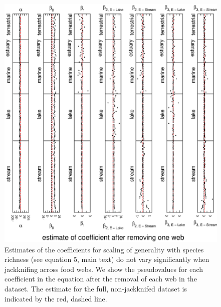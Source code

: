 \documentclass[12pt]{article}
\begin{document}
  \newpage

    \begin{figure}[!h]
    \centerline{\includegraphics*[height=.75\textheight]{Figures/Jackknife/Gen_web.eps}}
    \caption{Estimates of the coefficients for scaling of generality with species richness
    (see equation 5, main text) do not vary significantly
    when jackknifing across food webs. We show the pseudovalues for each coefficient
    in the equation after the removal of each web in the dataset. The estimate for the full, non-jackknifed
    dataset is indicated by the red, dashed line. }
    \label{Gen_web}
    \end{figure}

  \newpage
\end{document}
